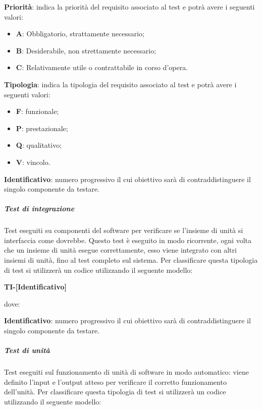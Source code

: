                 \textbf{Priorità}: indica la priorità del requisito associato al test e potrà avere i seguenti valori:
                \begin{itemize}
                    \item \textbf{A}: Obbligatorio, strattamente necessario;
                    \item \textbf{B}: Desiderabile, non strettamente necessario;
                    \item \textbf{C}: Relativamente utile o contrattabile in corso d'opera. 
                 \end{itemize} 
                 \textbf{Tipologia}: indica la tipologia del requisito associato al test e potrà avere i seguenti valori:
                 \begin{itemize}
                    \item \textbf{F}: funzionale;
                    \item \textbf{P}: prestazionale;
                    \item \textbf{Q}: qualitativo;
                    \item \textbf{V}: vincolo.
                 \end{itemize}
                \textbf{Identificativo}: numero progressivo il cui obiettivo sarà di contraddistinguere il singolo componente da testare.

                 \subparagraph*{Test di integrazione}
        			Test eseguiti su componenti del software per verificare se l'insieme di unità si interfaccia come dovrebbe. Questo test è eseguito in modo ricorrente, ogni volta che un insieme di unità esegue correttamente, esso viene integrato con altri insiemi di unità, fino al test completo sul sistema.
                    Per classificare questa tipologia di test si utilizzerà un codice utilizzando il seguente modello:     

                        \begin{center}
                        \textbf{TI-[Identificativo]}
                        \end{center}
                        dove:

                        \textbf{Identificativo}: numero progressivo il cui obiettivo sarà di contraddistinguere il singolo componente da testare.

                    \subparagraph*{Test di unità}
                            Test eseguiti sul funzionamento di unità di software in modo automatico: viene definito l'input e l'output atteso per verificare il corretto funzionamento dell'unità.
                            Per classificare questa tipologia di test si utilizzerà un codice utilizzando il seguente modello:     


